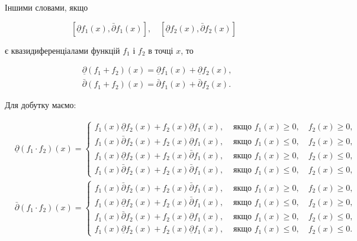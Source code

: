 \documentclass[12pt,a4paper]{extarticle}
\numberwithin{section}{part}
\begin{document}
Іншими словами, якщо

$$
\left[\underline{\partial} f_{1}(x), \bar{\partial} f_{1}(x)\right], \quad\left[\underline{\partial} f_{2}(x), \bar{\partial} f_{2}(x)\right]
$$

є квазидиференціалами функцій $f_{1}$ і $f_{2}$ в точці $x$, то

$$
\begin{aligned}
& \underline{\partial}\left(f_{1}+f_{2}\right)(x)=\underline{\partial} f_{1}(x)+\underline{\partial} f_{2}(x), \\
& \bar{\partial}\left(f_{1}+f_{2}\right)(x)=\bar{\partial} f_{1}(x)+\bar{\partial} f_{2}(x) .
\end{aligned}
$$

Для добутку маємо:

$$
\begin{aligned}
& \underline{\partial}\left(f_{1} \cdot f_{2}\right)(x)= \begin{cases}f_{1}(x) \underline{\partial} f_{2}(x)+f_{2}(x) \underline{\partial} f_{1}(x), & \text { якщо } f_{1}(x) \geq 0, \quad f_{2}(x) \geq 0, \\
f_{1}(x) \bar{\partial} f_{2}(x)+f_{2}(x) \underline{\partial} f_{1}(x), & \text { якщо } f_{1}(x) \leq 0, \quad f_{2}(x) \geq 0, \\
f_{1}(x) \underline{\partial} f_{2}(x)+f_{2}(x) \bar{\partial} f_{1}(x), & \text { якщо } f_{1}(x) \geq 0, \quad f_{2}(x) \leq 0, \\
f_{1}(x) \bar{\partial} f_{2}(x)+f_{2}(x) \bar{\partial} f_{1}(x), & \text { якщо } f_{1}(x) \leq 0, \quad f_{2}(x) \leq 0,\end{cases} \\
& \bar{\partial}\left(f_{1} \cdot f_{2}\right)(x)= \begin{cases}f_{1}(x) \bar{\partial} f_{2}(x)+f_{2}(x) \bar{\partial} f_{1}(x), & \text { якщо } f_{1}(x) \geq 0, \quad f_{2}(x) \geq 0, \\
f_{1}(x) \underline{\partial} f_{2}(x)+f_{2}(x) \bar{\partial} f_{1}(x), & \text { якщо } f_{1}(x) \leq 0, \quad f_{2}(x) \geq 0, \\
f_{1}(x) \bar{\partial} f_{2}(x)+f_{2}(x) \underline{\partial} f_{1}(x), & \text { якщо } f_{1}(x) \geq 0, \quad f_{2}(x) \leq 0, \\
f_{1}(x) \underline{\partial} f_{2}(x)+f_{2}(x) \underline{\partial} f_{1}(x), & \text { якщо } f_{1}(x) \leq 0, \quad f_{2}(x) \leq 0 .\end{cases}
\end{aligned}
$$
\end{document}
